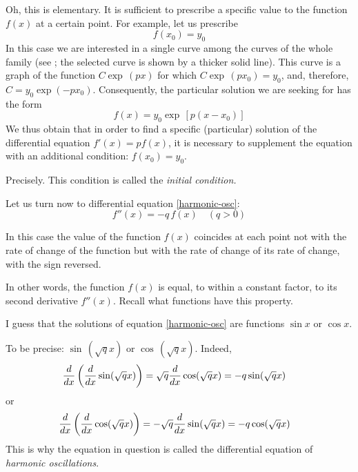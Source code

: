 \athr Oh, this is elementary. It is sufficient to prescribe a specific value to the function $f (x)$ at a certain point. For example, let us prescribe
\begin{equation*}%
f (x_{0}) = y_{0}
\end{equation*}
In this case we are interested in a single curve among the curves of the whole family (see ; the selected curve is shown by a thicker solid line). This curve is a graph of the function $C \exp \, (px)$ for which $C \exp \, (p x_{0}) = y_{0}$, and, therefore, $C = y_{0} \exp (-px_{0})$. Consequently, the particular solution we are seeking for has the form
\begin{equation}%
 f(x) = y_{0} \exp \, [p(x- x_{0})]
 \label{exp-soln}
\end{equation}
\rdr We thus obtain that in order to find a specific (particular) solution of the differential equation $f' (x) = p f (x)$, it is necessary to supplement the equation with an additional condition: $f (x_{0}) = y_{0}$.

\athr Precisely. This condition is called the \emph{initial condition.}

Let us turn now to differential equation \eqref{harmonic-osc}:
 \begin{equation*}%
f''(x) = -q \, f(x) \quad (q>0)
\end{equation*}

\rdr In this case the value of the function $f (x)$ coincides at each point not with the rate of change of the function but with the rate of change of its rate of change, with the sign reversed.

\athr In other words, the function $f (x)$ is equal, to within a constant factor, to its second derivative $f'' (x)$. Recall what functions have this property.

\rdr I guess that the solutions of equation \eqref{harmonic-osc} are functions $\sin x$ or $\cos x$.

\athr To be	precise: $\sin \, (\sqrt{q} x)$	or	$\cos \, (\sqrt{q}x)$. Indeed,
\begin{align*}%
\ddx \left( \ddx \sin (\sqrt{q}x) \right) & = \sqrt{q} \ddx \cos (\sqrt{q}x) = - q \sin (\sqrt{q} x) 
\end{align*}
or
\begin{align*}%
\ddx \left( \ddx \cos (\sqrt{q}x) \right) & = - \sqrt{q} \ddx \sin (\sqrt{q}x) = - q \cos (\sqrt{q} x) 
\end{align*}
This is why the equation in question is called the differential equation of \emph{harmonic oscillations}.

